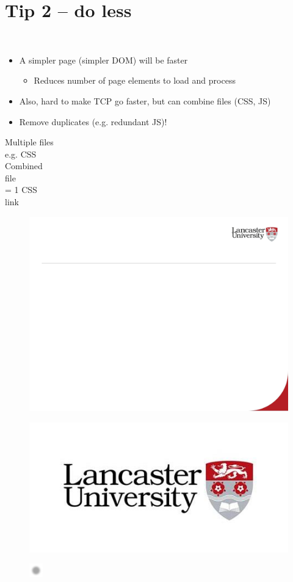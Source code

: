 \documentclass[12pt]{article}
\begin{document}
\section{Tip 2 – do less}
\\
\begin{itemize}
  \item A simpler page (simpler DOM) will be faster
\begin{itemize}
  \item Reduces number of page elements to load and process
\end{itemize}
  \item Also, hard to make TCP go faster, but can combine files (CSS, JS)
  \item Remove duplicates (e.g. redundant JS)!
\end{itemize}
Multiple files\\
e.g. CSS\\
Combined \\
file\\
= 1 CSS \\
link\\
\begin{figure}[H]
\includegraphics[width=0.5\linewidth]{page49-image-1.png}
\end{figure}
\begin{figure}[H]
\includegraphics[width=0.5\linewidth]{page49-image-2.png}
\end{figure}
\begin{figure}[H]
\includegraphics[width=0.5\linewidth]{page49-image-3.png}
\end{figure}
\end{document}

